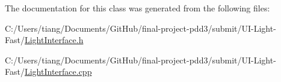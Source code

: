 The documentation for this class was generated from the following files\+:\begin{DoxyCompactItemize}
\item 
C\+:/\+Users/tiang/\+Documents/\+Git\+Hub/final-\/project-\/pdd3/submit/\+U\+I-\/\+Light-\/\+Fast/\mbox{\hyperlink{_light_interface_8h}{Light\+Interface.\+h}}\item 
C\+:/\+Users/tiang/\+Documents/\+Git\+Hub/final-\/project-\/pdd3/submit/\+U\+I-\/\+Light-\/\+Fast/\mbox{\hyperlink{_light_interface_8cpp}{Light\+Interface.\+cpp}}\end{DoxyCompactItemize}
